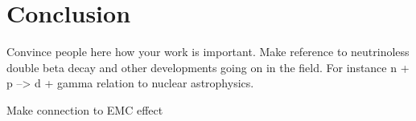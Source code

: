 \cleardoublepage
\chapter{Conclusion}

	Convince people here how your work is important. Make reference to neutrinoless
	double beta decay and other developments going on in the field. For instance
	n + p --> d + gamma relation to nuclear astrophysics.

	Make connection to EMC effect
